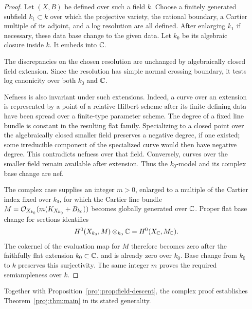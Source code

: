 \begin{proof}
Let \((X,B)\) be defined over such a field \(k\). Choose a finitely
generated subfield \(k_1\subset k\) over which the projective variety,
the rational boundary, a Cartier multiple of its adjoint, and a log
resolution are all defined. After enlarging \(k_1\) if necessary,
these data base change to the given data. Let \(k_0\) be its algebraic
closure inside \(k\). It embeds into \(\mathbb{C}\).

The discrepancies on the chosen resolution are unchanged by
algebraically closed field extension. Since the resolution has simple
normal crossing boundary, it tests log canonicity over both \(k_0\)
and \(\mathbb{C}\).

Nefness is also invariant under such extensions. Indeed, a curve
over an extension is represented by a point of a relative Hilbert
scheme after its finite defining data have been spread over a
finite-type parameter scheme. The degree of a fixed line bundle is
constant in the resulting flat family. Specializing to a closed
point over the algebraically closed smaller field preserves a
negative degree, if one existed; some irreducible component of the
specialized curve would then have negative degree. This contradicts
nefness over that field. Conversely, curves over the smaller field
remain available after extension. Thus the \(k_0\)-model and its
complex base change are nef.

The complex case supplies an integer \(m>0\), enlarged to a multiple
of the Cartier index fixed over \(k_0\), for which the Cartier
line bundle \(M=\mathcal{O}_{X_{k_0}}(m(K_{X_{k_0}}+B_{k_0}))\) becomes
globally generated over \(\mathbb{C}\). Proper flat base change for sections
identifies
\[
 H^0(X_{k_0},M)\otimes_{k_0}\mathbb{C}
   = H^0(X_{\mathbb{C}},M_{\mathbb{C}}).
\]
The cokernel of the evaluation map for \(M\) therefore becomes zero
after the faithfully flat extension \(k_0\subset\mathbb{C}\), and is already
zero over \(k_0\). Base change from \(k_0\) to \(k\) preserves this
surjectivity. The same integer \(m\) proves the required
semiampleness over \(k\).
\end{proof}

Together with Proposition~\ref{proj:prop:field-descent}, the complex proof
establishes Theorem~\ref{proj:thm:main} in its stated generality.

